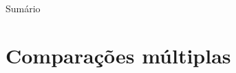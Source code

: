 \documentclass{beamer}
\title%
{}
\subtitle
{} %
\author%
{Felipe Figueiredo}%
\institute[INTO] %
{
}
\date%
{}
\begin{document}
\begin{frame}
  \titlepage
\end{frame}

\begin{frame}{Sumário}
  \tableofcontents
\end{frame}








\section{Comparações múltiplas}
\end{document}
